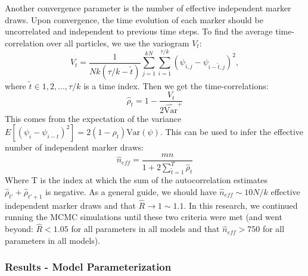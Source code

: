 \documentclass[
]{article}
\begin{document}
Another convergence parameter is the number of effective independent
marker draws. Upon convergence, the time evolution of each marker should
be uncorrelated and independent to previous time steps. To find the
average time-correlation over all particles, we use the variogram
\(V_t\): \begin{equation}
  V_t=\frac{1}{Nk(\tau/k-\tilde{t})}\sum_{j=1}^{kN}\sum_{i=1}^{\tau/k}(\psi_{i,j}-\psi_{i-\tilde{t},j})^2,
\end{equation} where \(\tilde{t}\in 1,2,...,\tau/k\) is a time index.
Then we get the time-correlations: \begin{equation}
  \hat{\rho}_t=1-\frac{V_t}{2\hat{\text{Var}}^+}
\end{equation} This comes from the expectation of the variance
\(E[(\psi_i-\psi_{i-t})^2]=2(1-\rho_t)\text{Var}(\psi)\). This can be
used to infer the effective number of independent marker draws:
\begin{equation}
  \hat{n}_{eff}=\frac{mn}{1+2\sum_{\tilde{t}=1}^T\hat{\rho}_t}
\end{equation} Where T is the index at which the sum of the
autocorrelation estimates \(\hat{\rho}_{t'}+\hat{\rho}_{t'+1}\) is
negative. As a general guide, we should have \(\hat{n}_{eff}\sim 10N/k\)
effective independent marker draws and that \(\hat{R}\to 1\sim 1.1\). In
this research, we continued running the MCMC simulations until these two
criteria were met (and went beyond: \(\hat{R}<1.05\) for all parameters
in all models and that \(\hat{n}_{eff}>750\) for all parameters in all
models).

\hypertarget{results---model-parameterization}{%
\subsubsection{Results - Model
Parameterization}\label{results---model-parameterization}}
\end{document}
